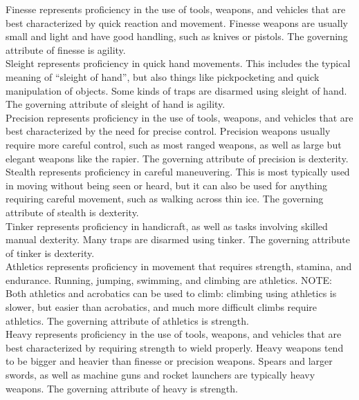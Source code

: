 \documentclass[letterpaper,titlepage,openany,twocolumn]{book}
\begin{document}
Finesse represents proficiency in the use of tools, weapons, and vehicles that are best characterized by quick reaction and movement. Finesse weapons are usually small and light and have good handling, such as knives or pistols. The governing attribute of finesse is agility.\\

Sleight represents proficiency in quick hand movements. This includes the typical meaning of “sleight of hand”, but also things like pickpocketing and quick manipulation of objects. Some kinds of traps are disarmed using sleight of hand. The governing attribute of sleight of hand is agility.\\

Precision represents proficiency in the use of tools, weapons, and vehicles that are best characterized by the need for precise control. Precision weapons usually require more careful control, such as most ranged weapons, as well as large but elegant weapons like the rapier. The governing attribute of precision is dexterity.\\

Stealth represents proficiency in careful maneuvering. This is most typically used in moving without being seen or heard, but it can also be used for anything requiring careful movement, such as walking across thin ice. The governing attribute of stealth is dexterity.\\

Tinker represents proficiency in handicraft, as well as tasks involving skilled manual dexterity. Many traps are disarmed using tinker. The governing attribute of tinker is dexterity.\\

Athletics represents proficiency in movement that requires strength, stamina, and endurance. Running, jumping, swimming, and climbing are athletics. NOTE: Both athletics and acrobatics can be used to climb: climbing using athletics is slower, but easier than acrobatics, and much more difficult climbs require athletics. The governing attribute of athletics is strength.\\

Heavy represents proficiency in the use of tools, weapons, and vehicles that are best characterized by requiring strength to wield properly. Heavy weapons tend to be bigger and heavier than finesse or precision weapons. Spears and larger swords, as well as machine guns and rocket launchers are typically heavy weapons. The governing attribute of heavy is strength.\\
\end{document}
